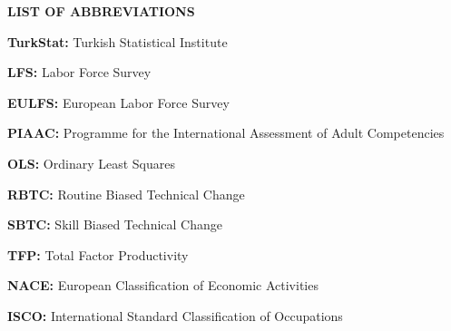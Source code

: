 \begin{center}
\vspace{12pt}
\par\end{center}

\begin{center}
\textbf{LIST OF ABBREVIATIONS}
\par\end{center}

\textbf{TurkStat: }Turkish Statistical Institute

\textbf{LFS: }Labor Force Survey

\textbf{EULFS:} European Labor Force Survey

\textbf{PIAAC:} Programme for the International Assessment of Adult
Competencies

\textbf{OLS: }Ordinary Least Squares

\textbf{RBTC:} Routine Biased Technical Change

\textbf{SBTC:} Skill Biased Technical Change

\textbf{TFP:} Total Factor Productivity

\textbf{NACE:} European Classification of Economic Activities

\textbf{ISCO:} International Standard Classification of Occupations 
\begin{center}
\pagebreak
\par\end{center}
